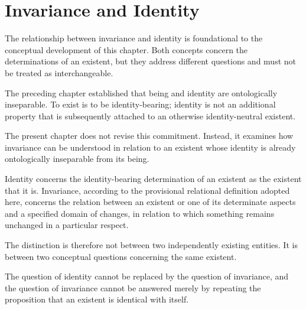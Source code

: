 

\section{Invariance and Identity}
\label{sec:invariance-and-identity}


The relationship between invariance and identity is
foundational to the conceptual development of this chapter.
Both concepts concern the determinations of an existent,
but they address different questions and must not be treated
as interchangeable.

The preceding chapter established that being and identity
are ontologically inseparable. To exist is to be
identity-bearing; identity is not an additional property
that is subsequently attached to an otherwise
identity-neutral existent.

The present chapter does not revise this commitment.
Instead, it examines how invariance can be understood
in relation to an existent whose identity is already
ontologically inseparable from its being.

Identity concerns the identity-bearing determination
of an existent as the existent that it is. Invariance,
according to the provisional relational definition
adopted here, concerns the relation between an existent
or one of its determinate aspects and a specified
domain of changes, in relation to which something
remains unchanged in a particular respect.

The distinction is therefore not between two
independently existing entities. It is between two
conceptual questions concerning the same existent.

The question of identity cannot be replaced by the
question of invariance, and the question of invariance
cannot be answered merely by repeating the proposition
that an existent is identical with itself.


